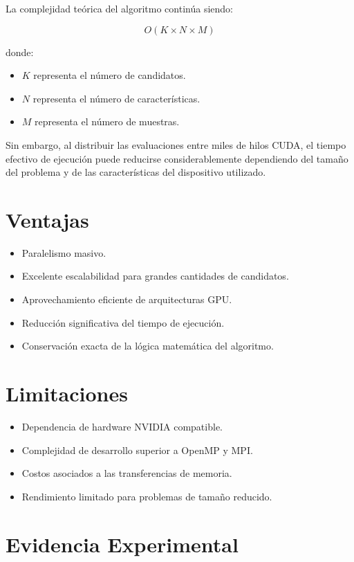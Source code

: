 La complejidad teórica del algoritmo continúa siendo:

\[
O(K \times N \times M)
\]

donde:

\begin{itemize}
    \item $K$ representa el número de candidatos.
    \item $N$ representa el número de características.
    \item $M$ representa el número de muestras.
\end{itemize}

Sin embargo, al distribuir las evaluaciones entre miles de hilos CUDA, el tiempo efectivo de ejecución puede reducirse considerablemente dependiendo del tamaño del problema y de las características del dispositivo utilizado.

\section{Ventajas}

\begin{itemize}
    \item Paralelismo masivo.
    \item Excelente escalabilidad para grandes cantidades de candidatos.
    \item Aprovechamiento eficiente de arquitecturas GPU.
    \item Reducción significativa del tiempo de ejecución.
    \item Conservación exacta de la lógica matemática del algoritmo.
\end{itemize}

\section{Limitaciones}

\begin{itemize}
    \item Dependencia de hardware NVIDIA compatible.
    \item Complejidad de desarrollo superior a OpenMP y MPI.
    \item Costos asociados a las transferencias de memoria.
    \item Rendimiento limitado para problemas de tamaño reducido.
\end{itemize}

\section{Evidencia Experimental}

